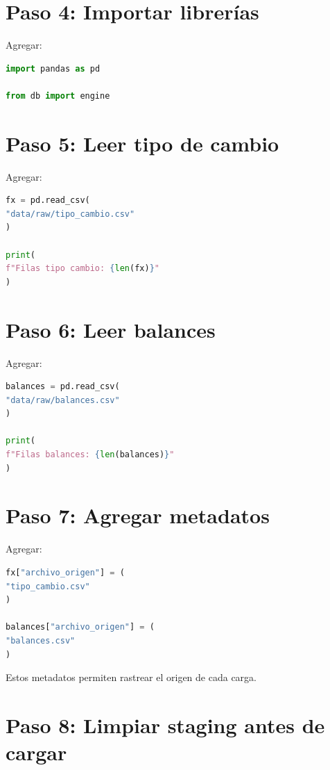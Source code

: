 \section{Paso 4: Importar librerías}

Agregar:

\begin{lstlisting}[language=Python]
import pandas as pd

from db import engine
\end{lstlisting}

\section{Paso 5: Leer tipo de cambio}

Agregar:

\begin{lstlisting}[language=Python]
fx = pd.read_csv(
"data/raw/tipo_cambio.csv"
)

print(
f"Filas tipo cambio: {len(fx)}"
)
\end{lstlisting}

\section{Paso 6: Leer balances}

Agregar:

\begin{lstlisting}[language=Python]
balances = pd.read_csv(
"data/raw/balances.csv"
)

print(
f"Filas balances: {len(balances)}"
)
\end{lstlisting}

\section{Paso 7: Agregar metadatos}

Agregar:

\begin{lstlisting}[language=Python]
fx["archivo_origen"] = (
"tipo_cambio.csv"
)

balances["archivo_origen"] = (
"balances.csv"
)
\end{lstlisting}

Estos metadatos permiten rastrear el origen de cada carga.

\section{Paso 8: Limpiar staging antes de cargar}

